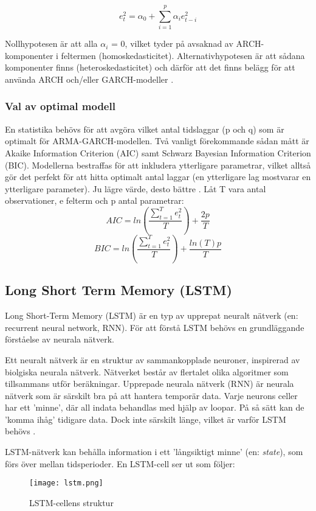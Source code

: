 \documentclass[12pt]{article}
\begin{document}
\begin{equation}
    e_t^2=\alpha_0+\sum_{i=1}^{p}\alpha_ie_{t-i}^2
\end{equation}

Nollhypotesen är att alla \(\alpha_i\) = 0, vilket tyder på avsaknad av ARCH-komponenter i feltermen (homoskedasticitet). Alternativhypotesen är att sådana komponenter finns (heteroskedasticitet) och därför att det finns belägg för att använda ARCH och/eller GARCH-modeller \parencite{engle1982autoregressive}. \par

\subsubsection{Val av optimal modell}
En statistika behövs för att avgöra vilket antal tidslaggar (p och q) som är optimalt för ARMA-GARCH-modellen. Två vanligt förekommande sådan mått är Akaike Information Criterion (AIC) samt Schwarz Bayesian Information Criterion (BIC). Modellerna bestraffas för att inkludera ytterligare parametrar, vilket alltså gör det perfekt för att hitta optimalt antal laggar (en ytterligare lag mostvarar en ytterligare parameter). Ju lägre värde, desto bättre \parencite{montgomery2015forecasting}. Låt T vara antal observationer, e felterm och p antal parametrar:
\begin{equation}
    AIC = ln\left( \frac{\sum_{t=1}^{T}e^2_t}{T} \right)+\frac{2p}{T}
\end{equation}
\begin{equation}
    BIC = ln\left( \frac{\sum_{t=1}^{T}e^2_t}{T} \right)+\frac{ln(T)p}{T}
\end{equation}


\subsection{Long Short Term Memory (LSTM)}
Long Short-Term Memory (LSTM) är en typ av upprepat neuralt nätverk (en: recurrent neural network, RNN). För att förstå LSTM behövs en grundläggande förståelse av neurala nätverk. \par

Ett neuralt nätverk är en struktur av sammankopplade neuroner, inspirerad av biolgiska neurala nätverk. Nätverket består av flertalet olika algoritmer som tillsammans utför beräkningar. Upprepade neurala nätverk (RNN) är neurala nätverk som är särskilt bra på att hantera temporär data. Varje neurons celler har ett 'minne', där all indata behandlas med hjälp av loopar. På så sätt kan de 'komma ihåg' tidigare data. Dock inte särskilt länge, vilket är varför LSTM behövs \parencite{purkait2019hands}. \par
LSTM-nätverk kan behålla information i ett 'långsiktigt minne' (en: \textit{state}), som förs över mellan tidsperioder. En LSTM-cell ser ut som följer:
\begin{figure}[H]
\caption{LSTM-cellens struktur \parencite[lånad från][]{yuan2019nonlinear}}
\texttt{[image: lstm.png]}
\centering
\end{figure}
\end{document}
